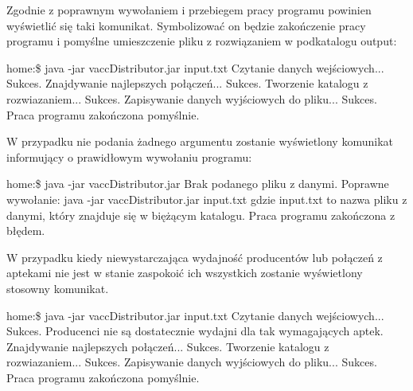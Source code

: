 \documentclass[a4paper]{article}
\newcommand\tab[1][1cm]{\hspace*{#1}}
\begin{document}
Zgodnie z poprawnym wywołaniem i przebiegem pracy programu powinien wyświetlić się taki komunikat. Symbolizować on będzie zakończenie pracy programu i pomyślne umieszczenie pliku z rozwiązaniem w podkatalogu output:
\begin{tcolorbox}
home:\$	java -jar vaccDistributor.jar input.txt
\newline Czytanie danych wejściowych... Sukces.
\newline Znajdywanie najlepszych połączeń... Sukces.
\newline Tworzenie katalogu z rozwiazaniem... Sukces.
\newline Zapisywanie danych wyjściowych do pliku... Sukces.
\newline 
\newline Praca programu zakończona pomyślnie.
\end{tcolorbox}

\newpage
W przypadku nie podania żadnego argumentu zostanie wyświetlony komunikat informujący o prawidłowym wywołaniu programu:
\begin{tcolorbox}
home:\$	java -jar vaccDistributor.jar
\newline Brak podanego pliku z danymi. Poprawne wywołanie:
\newline \tab java -jar vaccDistributor.jar input.txt
\newline gdzie input.txt to nazwa pliku z danymi, który znajduje się w biężącym katalogu.
\newline 
\newline Praca programu zakończona z błędem.
\end{tcolorbox}

W przypadku kiedy niewystarczająca wydajność producentów lub połączeń z aptekami nie jest w stanie zaspokoić ich wszystkich zostanie wyświetlony stosowny komunikat.
\begin{tcolorbox}
home:\$	java -jar vaccDistributor.jar input.txt
\newline Czytanie danych wejściowych... Sukces.
\newline [Ostrzeżenie] Producenci nie są dostatecznie wydajni dla tak wymagających aptek.
\newline Znajdywanie najlepszych połączeń... Sukces.
\newline Tworzenie katalogu z rozwiazaniem... Sukces.
\newline Zapisywanie danych wyjściowych do pliku... Sukces.
\newline 
\newline Praca programu zakończona pomyślnie.
\end{tcolorbox}
\end{document}
